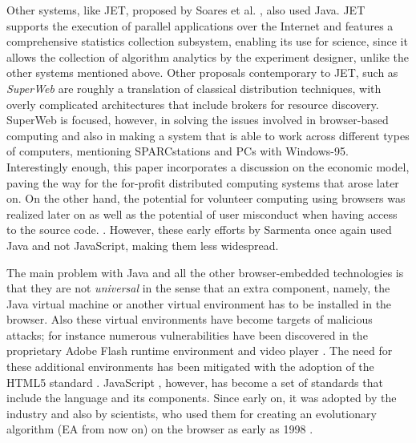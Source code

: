 \documentclass[journal,onecolumn]{IEEEtran}
\begin{document}
Other systems, like JET, proposed by Soares et
al. \cite{soares1998get}, also used Java. JET supports
the execution of parallel applications over the Internet and features
a comprehensive statistics collection subsystem, enabling its use for science, %
since it allows %
the collection of algorithm analytics by the
experiment designer, unlike the other systems mentioned
above. Other proposals contemporary to JET, such as {\em SuperWeb}
\cite{alexandrov1997superweb} are roughly a translation of classical
distribution techniques, with overly complicated architectures that include
brokers for resource discovery. SuperWeb is focused,
however, in solving the
issues involved in browser-based computing and also in making a system
that is able to work across different types of computers, mentioning
SPARCstations and PCs with Windows-95. Interestingly enough, this
paper incorporates a discussion on the economic model, paving the way
for the for-profit distributed computing systems that arose later on. 
On the other hand, the potential for volunteer computing using
browsers was realized
later on \cite{sarmenta-bayanihan} as well as the potential of
user misconduct when having access to the source code.
\cite{sarmenta-sabotagetolerance}. However, these early efforts by
Sarmenta once again used Java and not JavaScript, making them %
less widespread.

The main problem with Java and all the other browser-embedded
technologies is that they are not {\em universal} in the
sense that an extra component, namely, the Java virtual machine or another
virtual environment has to be installed in the browser.
Also these virtual environments have become targets of malicious attacks; 
for instance numerous vulnerabilities have been discovered in 
the proprietary Adobe Flash runtime environment and
video player \cite{ford2009analyzing,watanabe2010new}. The need for
these additional environments has been mitigated with the
adoption of the HTML5 standard \cite{anthes2012html5}.
JavaScript \cite{flanagan2006javascript}, however, has become a set of standards
\cite{ECMA-262} that include the language and its components. Since
early on, it was adopted by the industry and also by scientists,
who used them for creating an evolutionary algorithm (EA from now on) on
the browser as early as 1998 \cite{jj-ppsn98}.
\end{document}
